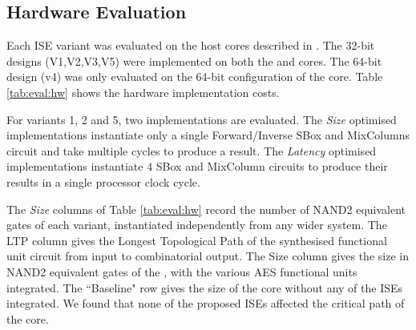 
\subsection{Hardware Evaluation}
\label{sec:eval:sw}

Each ISE variant was evaluated on the host cores
described in .
The 32-bit designs (V1,V2,V3,V5) were implemented on both the
 and  cores.
The 64-bit design (v4) was only evaluated on the 64-bit configuration
of the  core.
Table \ref{tab:eval:hw} shows the hardware implementation costs.

For variants 1, 2 and 5, two implementations are evaluated.
The {\em Size} optimised implementations instantiate only a single
Forward/Inverse SBox and MixColumns circuit and take multiple cycles
to produce a result.
The {\em Latency} optimised implementations instantiate $4$ SBox and
MixColumn circuits to produce their results in a single processor 
clock cycle.

The {\em Size} columns of Table \ref{tab:eval:hw} 
record the number of NAND2 equivalent gates of each variant,
instantiated independently from any wider system.
The LTP column gives the Longest Topological Path of the synthesised
functional unit circuit from input to combinatorial output.
The  Size column gives the size in NAND2 equivalent gates of the
, with the various AES functional units integrated.
The ``Baseline" row gives the size of the core without any of the
ISEs integrated.
We found that none of the proposed ISEs affected the critical
path of the  core.


